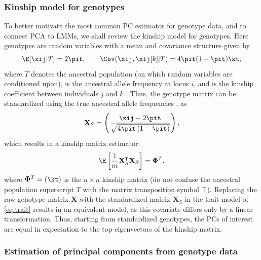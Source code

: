 \documentclass[11pt]{article}
\begin{document}
\subsubsection{Kinship model for genotypes}

To better motivate the most common PC estimator for genotype data, and to connect PCA to LMMs, we shall review the kinship model for genotypes.
Here genotypes are random variables with a mean and covariance structure given by
$$
\E[ \xij | T ]
=
2 \pit,
\quad\quad
\Cov( \xij, \xij[k] | T )
=
4 \pit ( 1 - \pit ) \kt,
$$
where $T$ denotes the ancestral population (on which random variables are conditioned upon), \pit is the ancestral allele frequency at locus $i$, and \kt is the kinship coefficient between individuals $j$ and $k$ \citep{malecot_mathematiques_1948, wright_genetical_1951, jacquard_structures_1970}.
Thus, the genotype matrix can be standardized using the true ancestral allele frequencies \pit, as
$$
\mathbf{X}_S
=
\left(
  \frac{
    \xij - 2 \pit
  }{
    \sqrt{4 \pit \left( 1 - \pit \right)}
  }
\right)
,
$$
which results in a kinship matrix estimator:
$$
\E
\left[
\frac{1}{m}
\mathbf{X}_S^\intercal
\mathbf{X}_S
\right]
=
\mathbf{\Phi}^T
,
$$
where $\mathbf{\Phi}^T = ( \kt )$ is the $n \times n$ kinship matrix (do not confuse the ancestral population superscript $T$ with the matrix transposition symbol $\intercal$).
Replacing the raw genotype matrix $\mathbf{X}$ with the standardized matrix $\mathbf{X}_S$ in the trait model of \cref{eq:trait} results in an equivalent model, as this covariate differs only by a linear transformation.
Thus, starting from standardized genotypes, the PCs of interest are equal in expectation to the top eigenvectors of the kinship matrix.

\subsubsection{Estimation of principal components from genotype data}
\end{document}
